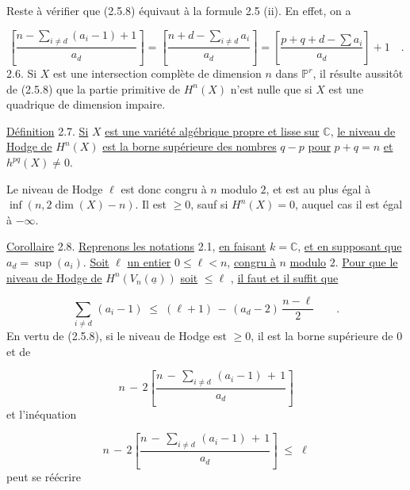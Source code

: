 Reste à vérifier que (2.5.8) équivaut à la formule 2.5 (ii). En effet, on a

\begin{equation*}
\left[ \displaystyle\frac{n - \sum\limits_{i \neq d} (a_i-1) + 1}{a_d} \right] = \left[ \displaystyle\frac{n + d - \sum\limits_{i \neq d} a_i}{a_d} \right] = \left[ \displaystyle\frac{p + q + d - \sum a_i}{a_d} \right] + 1 \quad .
\end{equation*}
2.6. \quad Si $X$ est une intersection complète de dimension $n$ dans $\mathbb{P}^r$, il résulte aussitôt de (2.5.8) que la partie primitive de $H^n(X)$ n'est nulle que si $X$ est une quadrique de dimension impaire.

\underline{Définition} 2.7. \underline{Si} $X$ \underline{est une variété algébrique propre et lisse sur} $\mathbb{C}$, \underline{le niveau de Hodge de} $H^n(X)$ \underline{est la borne supérieure des nombres} $q-p$ \underline{pour} $p+q = n$ \underline{et} $h^{pq}(X) \neq 0$.

Le niveau de Hodge $\ell$ est donc congru à $n$ modulo $2$, et est au plus égal à $\inf(n,2\dim(X) - n)$. Il est $\geq 0$, sauf si $H^n(X) = 0$, auquel cas il est égal à $- \infty$.

\underline{Corollaire} 2.8. \underline{Reprenons les notations} 2.1, \underline{en faisant} $k = \mathbb{C}$, \underline{et en supposant que} $a_d = \sup (a_i)$. \underline{Soit} $\ell$ \underline{un entier} $0 \leq \ell < n$, \underline{congru à} $n$ \underline{modulo} $2$. \underline{Pour que le niveau de Hodge de} $H^n(V_n(\underline{a}))$ \underline{soit} $\leq \ell$ , \underline{il faut et il suffit que} 



\begin{equation*}
 \sum_{i \neq d} \, (a_i - 1) \;\leq\; (\ell + 1) \, - \, (a_d - 2) \, \frac{n - \ell}{2} \qquad .
\end{equation*}
En vertu de (2.5.8), si le niveau de Hodge est $\geq 0$, il est la borne supérieure de 0 et de

\begin{equation*}
n \, - \, 2 \left[ \frac{n \, - \, \sum_{i \neq d} \, (a_i - 1) \, + \, 1}{a_d} \right]
\end{equation*}
et l'inéquation

\begin{equation*}
n \, - \, 2 \left[ \frac{n \, - \, \sum_{i \neq d} \, (a_i - 1) \, + \, 1}{a_d} \right] \;\leq\; \ell
\end{equation*}
peut se réécrire

